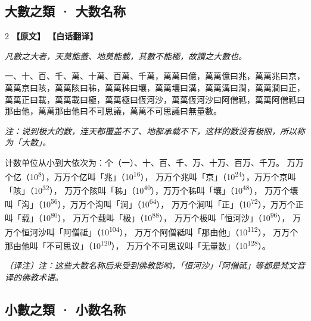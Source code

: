 \documentclass[11pt,a4paper]{article}
\newcommand{\noteMOD}[1]{\par\textcolor{notecolor}{\small\textit{〔译注〕#1}}\par\smallskip}
\begin{document}
\medskip

\subsection{大數之類 · 大数名称}

\begin{paracol}{2}
\noindent\textbf{\textcolor{leftlabel}{【原文】}}
\switchcolumn
\noindent\textbf{\textcolor{rightlabel}{【白话翻译】}}
\switchcolumn*

\textit{凡數之大者，天莫能蓋、地莫能載，其數不能極，故謂之大數也。}

\medskip

一、十、百、千、萬、十萬、百萬、千萬，萬萬曰億，萬萬億曰兆，萬萬兆曰京，萬萬京曰陔，萬萬陔曰秭，萬萬秭曰壤，萬萬壤曰溝，萬萬溝曰澗，萬萬澗曰正，萬萬正曰載，萬萬載曰極，萬萬極曰恆河沙，萬萬恆河沙曰阿僧祗，萬萬阿僧祗曰那由他，萬萬那由他曰不可思議，萬萬不可思議曰無量數。

\switchcolumn

\textit{注：说到极大的数，连天都覆盖不了、地都承载不下，这样的数没有极限，所以称为「大数」。}

\medskip

计数单位从小到大依次为：个（一）、十、百、千、万、十万、百万、千万。
万万个亿（10\textsuperscript{8}），万万个亿叫「兆」（10\textsuperscript{16}），
万万个兆叫「京」（10\textsuperscript{24}），万万个京叫「陔」（10\textsuperscript{32}），
万万个陔叫「秭」（10\textsuperscript{40}），万万个秭叫「壤」（10\textsuperscript{48}），
万万个壤叫「沟」（10\textsuperscript{56}），万万个沟叫「涧」（10\textsuperscript{64}），
万万个涧叫「正」（10\textsuperscript{72}），万万个正叫「载」（10\textsuperscript{80}），
万万个载叫「极」（10\textsuperscript{88}），
万万个极叫「恒河沙」（10\textsuperscript{96}），
万万个恒河沙叫「阿僧祗」（10\textsuperscript{104}），
万万个阿僧祗叫「那由他」（10\textsuperscript{112}），
万万个那由他叫「不可思议」（10\textsuperscript{120}），
万万个不可思议叫「无量数」（10\textsuperscript{128}）。

\noteMOD{注：这些大数名称后来受到佛教影响，「恒河沙」「阿僧祗」等都是梵文音译的佛教术语。}

\end{paracol}

\medskip

\subsection{小數之類 · 小数名称}
\end{document}
